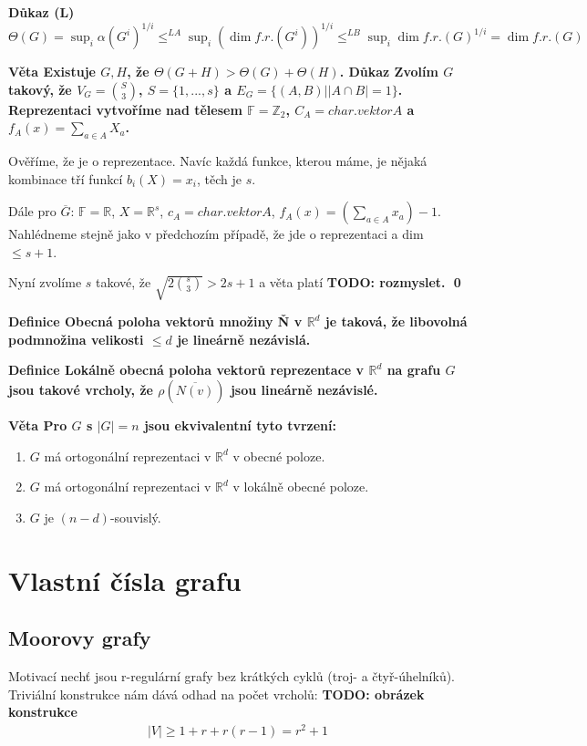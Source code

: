 \documentclass[a4paper,12pt,titlepage]{article}
\newcommand{\shn}{\Theta}
\newcommand{\dk}{\smallskip\noindent\bf Důkaz\rm{} }
\newcommand{\df}{\smallskip\noindent\bf Definice\rm{} }
\newcommand{\vt}{\smallskip\noindent\bf Věta\rm{} }
\newcommand{\Fr}{\mathbb{F}}
\newcommand{\Z}{\mathbb{Z}}
\newcommand{\R}{\mathbb{R}}
\newcommand{\todo}[1]{\bf TODO: \rm#1}
\begin{document}
\dk(L) $\shn(G) = \sup_i \alpha(G^i)^{1/i} \leq^{LA} \sup_i(\dim f.r.(G^i))^{1/i} \leq^{LB} \sup_i\dim f.r. (G)^{1/i} = \dim f.r.(G)$

\vt Existuje $G, H$, že $\shn(G+H) > \shn(G) + \shn(H)$.
\dk Zvolím $G$ takový, že $V_G=\binom{S}{3}$, $S = \{1, ..., s\}$ a $E_G = \{ (A, B) | |A\cap B| = 1\}$. Reprezentaci vytvoříme nad tělesem $\Fr = \Z_2$, $C_A = char. vektor A$ a $f_A(x) = \sum_{a\in A} X_a$.

Ověříme, že je o reprezentace. Navíc každá funkce, kterou máme, je nějaká kombinace tří funkcí $b_i(X) = x_i$, těch je $s$.

Dále pro $\overline G$: $\Fr = \R$, $X = \R^s$, $c_A = char. vektor A$, $f_A(x) = \left(\sum_{a\in A} x_a\right) -1$. Nahlédneme stejně jako v předchozím případě, že jde o reprezentaci a dim $\leq s+1$.

Nyní zvolíme $s$ takové, že $\sqrt{2\binom{s}{3}} > 2s + 1$ a věta platí \todo{rozmyslet}. \qed

\df Obecná poloha vektorů množiny \v N v  $\R^d$ je taková, že libovolná podmnožina velikosti $\leq d$ je lineárně nezávislá.

\df Lokálně obecná poloha vektorů reprezentace v $\R^d$ na grafu $G$ jsou takové vrcholy, že $\rho(\overline{N(v)})$ jsou lineárně nezávislé.

\vt Pro $G$ s $|G| = n$ jsou ekvivalentní tyto tvrzení:
\begin{enumerate}
	\item $G$ má ortogonální reprezentaci v $\R^d$ v obecné poloze.
	\item $G$ má ortogonální reprezentaci v $\R^d$ v lokálně obecné poloze.
	\item $G$ je $(n-d)$-souvislý.
\end{enumerate}


\section{Vlastní čísla grafu}
\subsection{Moorovy grafy}
Motivací nechť jsou r-regulární grafy bez krátkých cyklů (troj- a 
čtyř-úhelníků). Triviální konstrukce nám dává odhad na počet vrcholů:
\todo{obrázek konstrukce}
\begin{align}
\label{moorova-podminka}
	|V| \geq 1 + r + r(r-1) = r^2 +1
\end{align}
\end{document}
